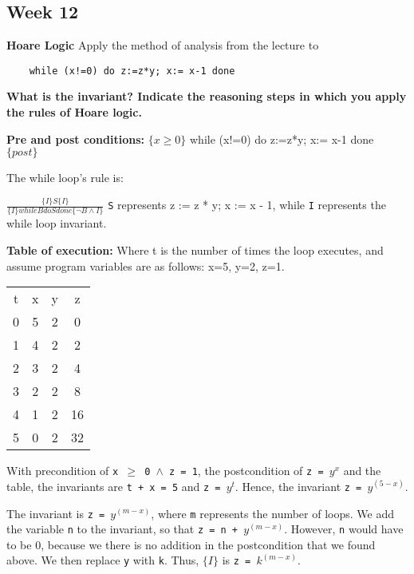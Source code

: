 \documentclass{article}
\theoremstyle{theorem}
\theoremstyle{definition}
\theoremstyle{remark}
\begin{document}
\subsection{Week 12}
\textbf{Hoare Logic}
\newline Apply the method of analysis from the lecture to
\begin{lstlisting}
    while (x!=0) do z:=z*y; x:= x-1 done
\end{lstlisting}

\noindent\textbf{What is the invariant? Indicate the reasoning steps in which you apply the rules of Hoare logic.}\newline

\textbf{Pre and post conditions:}
\newline $\{x \geq 0\}$  while (x!=0) do  z:=z*y; x:= x-1 done $\{post\}$

The while loop's rule is:

\medskip
\texttt{$\frac{\{I\} S \{I\}} {\{I\} while B do S done \{ \neg B \wedge I \}}$}
\medskip
\newline
\texttt{S} represents z := z * y; x := x - 1, while \texttt{I} represents the while loop invariant.\newline

\textbf{Table of execution:}
\newline Where t is the number of times the loop executes, and assume program variables are as follows: x=5, y=2, z=1.
\begin{center}
\begin{tabular}{ c c c c } 
 t & x & y & z \\ [0.5ex] 
0 & 5 & 2 & 0 \\ 
1 & 4 & 2 & 2 \\
2 & 3 & 2 & 4 \\
3 & 2 & 2 & 8 \\
4 & 1 & 2 & 16 \\ 
5 & 0 & 2 & 32 \\ 
\end{tabular}
\end{center}

\medskip\noindent
With precondition of \texttt{x $\geq$ 0 $\wedge$ z = 1}, the postcondition of \texttt{z = $y^x$} and the table, the invariants are \texttt{t + x = 5} and \texttt{z = $y^t$}. Hence, the invariant \texttt{z = $y^{(5 - x)}$}. 

\medskip\noindent
The invariant is \texttt{z = $y^{(m - x)}$}, where \texttt{m} represents the number of loops. We add the variable \texttt{n} to the invariant, so that \texttt{z = n + $y^{(m - x)}$}. However, \texttt{n} would have to be 0, because we there is no addition in the postcondition that we found above. We then replace \texttt{y} with \texttt{k}. Thus, $\{I\}$ is \texttt{z = $k^{(m - x)}$}.
\end{document}
